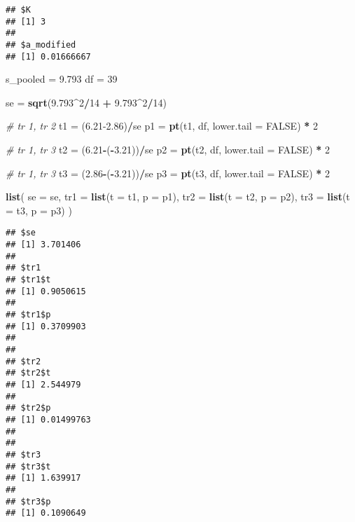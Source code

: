 \documentclass[]{book}
\newenvironment{Shaded}{\begin{snugshade}}{\end{snugshade}}
\newcommand{\CommentTok}[1]{\textcolor[rgb]{0.56,0.35,0.01}{\textit{#1}}}
\newcommand{\DataTypeTok}[1]{\textcolor[rgb]{0.13,0.29,0.53}{#1}}
\newcommand{\DecValTok}[1]{\textcolor[rgb]{0.00,0.00,0.81}{#1}}
\newcommand{\FloatTok}[1]{\textcolor[rgb]{0.00,0.00,0.81}{#1}}
\newcommand{\KeywordTok}[1]{\textcolor[rgb]{0.13,0.29,0.53}{\textbf{#1}}}
\newcommand{\NormalTok}[1]{#1}
\newcommand{\OperatorTok}[1]{\textcolor[rgb]{0.81,0.36,0.00}{\textbf{#1}}}
\newcommand{\OtherTok}[1]{\textcolor[rgb]{0.56,0.35,0.01}{#1}}
\newcommand{\StringTok}[1]{\textcolor[rgb]{0.31,0.60,0.02}{#1}}
\begin{document}
\begin{verbatim}
## $K
## [1] 3
## 
## $a_modified
## [1] 0.01666667
\end{verbatim}

\begin{Shaded}
\begin{Highlighting}[]
\NormalTok{s_pooled =}\StringTok{ }\FloatTok{9.793}
\NormalTok{df =}\StringTok{ }\DecValTok{39}

\NormalTok{se =}\StringTok{ }\KeywordTok{sqrt}\NormalTok{(}\FloatTok{9.793}\OperatorTok{^}\DecValTok{2}\OperatorTok{/}\DecValTok{14} \OperatorTok{+}\StringTok{ }\FloatTok{9.793}\OperatorTok{^}\DecValTok{2}\OperatorTok{/}\DecValTok{14}\NormalTok{)}

\CommentTok{# tr 1, tr 2}
\NormalTok{t1 =}\StringTok{ }\NormalTok{(}\FloatTok{6.21-2.86}\NormalTok{)}\OperatorTok{/}\NormalTok{se}
\NormalTok{p1 =}\StringTok{ }\KeywordTok{pt}\NormalTok{(t1, df, }\DataTypeTok{lower.tail =} \OtherTok{FALSE}\NormalTok{) }\OperatorTok{*}\StringTok{ }\DecValTok{2}

\CommentTok{# tr 1, tr 3}
\NormalTok{t2 =}\StringTok{ }\NormalTok{(}\FloatTok{6.21}\OperatorTok{-}\NormalTok{(}\OperatorTok{-}\FloatTok{3.21}\NormalTok{))}\OperatorTok{/}\NormalTok{se}
\NormalTok{p2 =}\StringTok{ }\KeywordTok{pt}\NormalTok{(t2, df, }\DataTypeTok{lower.tail =} \OtherTok{FALSE}\NormalTok{) }\OperatorTok{*}\StringTok{ }\DecValTok{2}

\CommentTok{# tr 1, tr 3}
\NormalTok{t3 =}\StringTok{ }\NormalTok{(}\FloatTok{2.86}\OperatorTok{-}\NormalTok{(}\OperatorTok{-}\FloatTok{3.21}\NormalTok{))}\OperatorTok{/}\NormalTok{se}
\NormalTok{p3 =}\StringTok{ }\KeywordTok{pt}\NormalTok{(t3, df, }\DataTypeTok{lower.tail =} \OtherTok{FALSE}\NormalTok{) }\OperatorTok{*}\StringTok{ }\DecValTok{2}

\KeywordTok{list}\NormalTok{(}
  \DataTypeTok{se =}\NormalTok{ se,}
  \DataTypeTok{tr1 =} \KeywordTok{list}\NormalTok{(}\DataTypeTok{t =}\NormalTok{ t1, }\DataTypeTok{p =}\NormalTok{ p1),}
  \DataTypeTok{tr2 =} \KeywordTok{list}\NormalTok{(}\DataTypeTok{t =}\NormalTok{ t2, }\DataTypeTok{p =}\NormalTok{ p2),}
  \DataTypeTok{tr3 =} \KeywordTok{list}\NormalTok{(}\DataTypeTok{t =}\NormalTok{ t3, }\DataTypeTok{p =}\NormalTok{ p3)}
\NormalTok{)}
\end{Highlighting}
\end{Shaded}

\begin{verbatim}
## $se
## [1] 3.701406
## 
## $tr1
## $tr1$t
## [1] 0.9050615
## 
## $tr1$p
## [1] 0.3709903
## 
## 
## $tr2
## $tr2$t
## [1] 2.544979
## 
## $tr2$p
## [1] 0.01499763
## 
## 
## $tr3
## $tr3$t
## [1] 1.639917
## 
## $tr3$p
## [1] 0.1090649
\end{verbatim}
\end{document}
